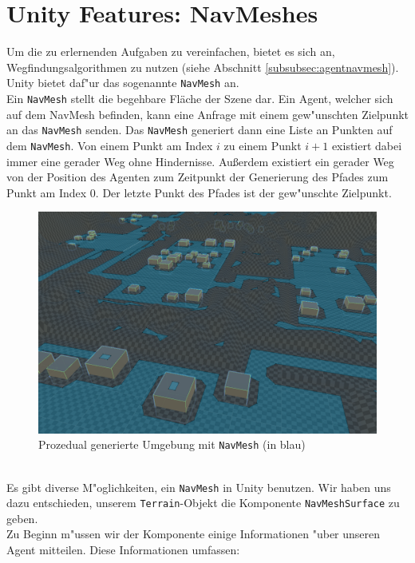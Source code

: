 \section{Unity Features: NavMeshes}

Um die zu erlernenden Aufgaben zu vereinfachen, bietet es sich an, Wegfindungsalgorithmen zu nutzen (siehe Abschnitt \ref{subsubsec:agentnavmesh}). Unity bietet daf"ur das sogenannte \texttt{NavMesh} an.
\\
Ein \texttt{NavMesh} stellt die begehbare Fläche der Szene dar. Ein Agent, welcher sich auf dem NavMesh befinden, kann eine Anfrage mit einem gew"unschten Zielpunkt an das \texttt{NavMesh} senden. Das \texttt{NavMesh} generiert dann eine Liste an Punkten auf dem \texttt{NavMesh}. Von einem Punkt am Index $i$ zu einem Punkt $i+1$ existiert dabei immer eine gerader Weg ohne Hindernisse. Außerdem existiert ein gerader Weg von der Position des Agenten zum Zeitpunkt der Generierung des Pfades zum Punkt am Index $0$. Der letzte Punkt des Pfades ist der gew"unschte Zielpunkt.
\begin{figure}
	\centering
	\includegraphics[width=0.8\linewidth]{resources/img/navMesh01.png}
	\caption{Prozedual generierte Umgebung mit \texttt{NavMesh} (in blau)}
	\label{fig:navMesh01}
\end{figure}
\\
Es gibt diverse M"oglichkeiten, ein \texttt{NavMesh} in Unity benutzen. Wir haben uns dazu entschieden, unserem \texttt{Terrain}-Objekt die Komponente \texttt{NavMeshSurface} zu geben.
\\
Zu Beginn m"ussen wir der Komponente einige Informationen "uber unseren Agent mitteilen. Diese Informationen umfassen:
